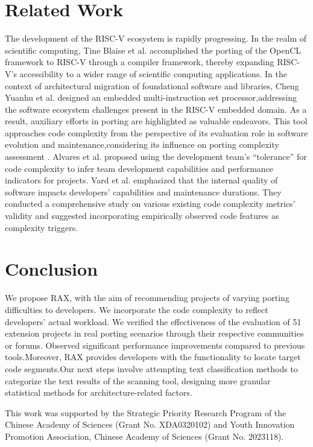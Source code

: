 \documentclass[sigconf,screen,review,anonymous]{acmart}
\begin{document}
\section{Related Work}
The development of the RISC-V ecosystem is rapidly progressing.
In the realm of scientific computing, Tine Blaise et al. \cite{osti_1830102} accomplished the porting of the OpenCL framework to RISC-V through a compiler framework, thereby expanding RISC-V's accessibility to a wider range of scientific computing applications.
In the context of architectural migration of foundational software and libraries, Cheng Yuanhu et al. \cite{2017Slow} designed an embedded multi-instruction set processor,addressing the software ecosystem challenges present in the RISC-V embedded domain.
As a result, auxiliary efforts in porting are highlighted as valuable endeavors.
This tool approaches code complexity from the perspective of its evaluation role in software evolution and maintenance,considering its influence on porting complexity assessment \cite{1993Software}.
Alvares et al. \cite{7844689} proposed using the development team's ``tolerance'' for code complexity to infer team development capabilities and performance indicators for projects.
Vard et al. \cite{2017Evaluating} emphasized that the internal quality of software impacts developers' capabilities and maintenance durations.
They conducted a comprehensive study on various existing code complexity metrics' validity and suggested incorporating empirically observed code features as complexity triggers.
\section{Conclusion}
We propose RAX, with the aim of recommending projects of varying porting difficulties to developers. We incorporate the code complexity to reflect developers' actual workload. We verified the effectiveness of the evaluation of 51 extension projects in real porting scenarios through their respective communities or forums. Observed significant performance improvements compared to previous tools.Moreover, RAX provides developers with the functionality to locate target code segments.Our next steps involve attempting text classification methods to categorize the text results of the scanning tool, designing more granular statistical methods for architecture-related factors.
\begin{acks}
  This work was supported by the Strategic Priority Research Program of the Chinese Academy of Sciences (Grant No. XDA0320102) and Youth Innovation Promotion Association, Chinese Academy of Sciences (Grant No. 2023118).
\end{acks}



\end{document}
